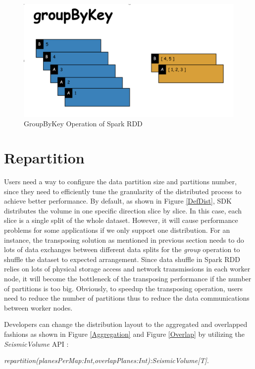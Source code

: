 \begin{figure}[h]
\centering
\includegraphics[scale=0.6]{figures/RDDGroup.png}
\caption{GroupByKey Operation of Spark RDD}
\label{RDDGroup}
\end{figure}


\section{Repartition}

Users need a way to configure the data partition size and partitions number, since they need to efficiently tune the granularity of the distributed process to achieve better performance. By default, as shown in Figure \ref{DefDist}, SDK distributes the volume in one specific direction slice by slice. In this case, each slice is a single split of the whole dataset. However, it will cause performance problems for some applications if we only support one distribution. For an instance, the transposing solution as mentioned in previous section needs to do lots of data exchanges between different data splits for the \emph{group} operation to shuffle the dataset to expected arrangement. Since data shuffle in Spark RDD relies on lots of physical storage access and network transmissions in each worker node, it will become the bottleneck of the transposing performance if the number of partitions is too big. Obviously, to speedup the transposing operation, users need to reduce the number of partitions thus to reduce the data communications between worker nodes.

Developers can change the distribution layout to the aggregated and overlapped fashions as shown in Figure \ref{Aggregation} and Figure \ref{Overlap} by utilizing the \emph{SeismicVolume} API :

\emph{repartition(planesPerMap:Int,overlapPlanes:Int):SeismicVolume[T]}.


